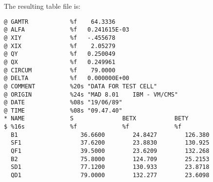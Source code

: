 The resulting table file is: 
\begin{verbatim}
@ GAMTR            %f    64.3336
@ ALFA             %f   0.241615E-03
@ XIY              %f   -.455678
@ XIX              %f    2.05279
@ QY               %f   0.250049
@ QX               %f   0.249961
@ CIRCUM           %f    79.0000
@ DELTA            %f   0.000000E+00
@ COMMENT          %20s "DATA FOR TEST CELL"
@ ORIGIN           %24s "MAD 8.01    IBM - VM/CMS"
@ DATE             %08s "19/06/89"
@ TIME             %08s "09.47.40"
* NAME             S              BETX           BETY
$ %16s             %f             %f             %f
  B1                  36.6600        24.8427        126.380
  SF1                 37.6200        23.8830        130.925
  QF1                 39.5000        23.6209        132.268
  B2                  75.8000        124.709        25.2153
  SD1                 77.1200        130.933        23.8718
  QD1                 79.0000        132.277        23.6098
\end{verbatim} 

